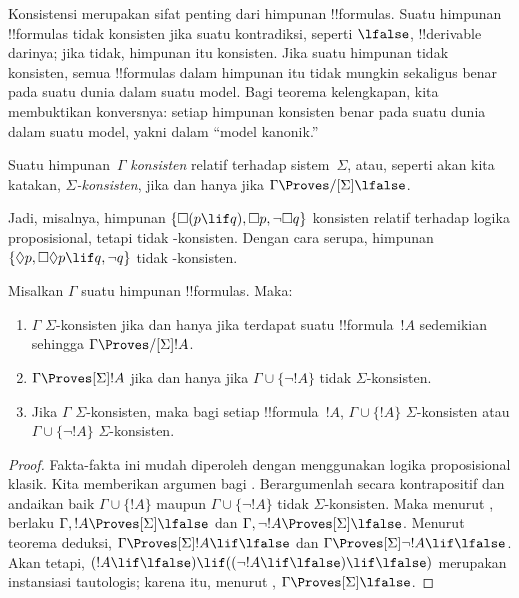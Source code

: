 \documentclass[../../../include/open-logic-section]{subfiles}
\begin{document}


Konsistensi merupakan sifat penting dari himpunan !!{formula}s. Suatu
himpunan !!{formula}s tidak konsisten jika suatu kontradiksi, seperti
$\lfalse$, !!{derivable} darinya; jika tidak, himpunan itu konsisten. Jika
suatu himpunan tidak konsisten, semua !!{formula}s dalam himpunan itu tidak
mungkin sekaligus benar pada suatu dunia dalam suatu model. Bagi teorema
kelengkapan, kita membuktikan konversnya: setiap himpunan konsisten benar pada
suatu dunia dalam suatu model, yakni dalam ``model kanonik.''

\begin{defn}
  Suatu himpunan~$\Gamma$ \emph{konsisten} relatif terhadap sistem~$\Sigma$,
  atau, seperti akan kita katakan, \emph{$\Sigma$-konsisten}, jika dan hanya
  jika $\Gamma\Proves/[\Sigma]\lfalse$.
\end{defn}

Jadi, misalnya, himpunan
$\{\Box(p\lif q),\Box p,\lnot\Box q\}$ konsisten relatif terhadap logika
proposisional, tetapi tidak -konsisten. Dengan cara serupa, himpunan
$\{\Diamond p,\Box\Diamond p\lif q,\lnot q\}$ tidak
-konsisten.

\begin{prop}
  Misalkan $\Gamma$ suatu himpunan !!{formula}s. Maka:
  \begin{enumerate}
  \item $\Gamma$ $\Sigma$-konsisten jika dan hanya jika terdapat suatu
    !!{formula}~$!A$ sedemikian sehingga $\Gamma\Proves/[\Sigma]!A$.
  \item {}%
    $\Gamma\Proves[\Sigma]!A$ jika dan hanya jika
    $\Gamma\cup\{\lnot!A\}$ tidak $\Sigma$-konsisten.
  \item {}%
    Jika $\Gamma$ $\Sigma$-konsisten, maka bagi setiap !!{formula}~$!A$,
    $\Gamma\cup\{!A\}$ $\Sigma$-konsisten atau
    $\Gamma\cup\{\lnot!A\}$ $\Sigma$-konsisten.
  \end{enumerate}
\end{prop}

\begin{proof}
  Fakta-fakta ini mudah diperoleh dengan menggunakan logika proposisional
  klasik. Kita memberikan argumen bagi .
  Berargumenlah secara kontrapositif dan andaikan baik
  $\Gamma\cup\{!A\}$ maupun $\Gamma\cup\{\lnot!A\}$ tidak
  $\Sigma$-konsisten. Maka menurut , berlaku
  $\Gamma,!A\Proves[\Sigma]\lfalse$ dan
  $\Gamma,\lnot!A\Proves[\Sigma]\lfalse$. Menurut teorema deduksi,
  $\Gamma\Proves[\Sigma]!A\lif\lfalse$ dan
  $\Gamma\Proves[\Sigma]\lnot!A\lif\lfalse$. Akan tetapi,
  $(!A\lif\lfalse)\lif((\lnot!A\lif\lfalse)\lif\lfalse)$ merupakan
  instansiasi tautologis; karena itu, menurut
  ,
  $\Gamma\Proves[\Sigma]\lfalse$.
\end{proof}
\end{document}
